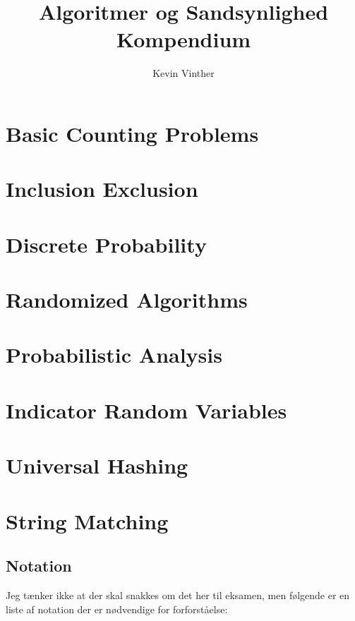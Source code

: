 \documentclass[11pt]{article}
\title{Algoritmer og Sandsynlighed \\ \large Kompendium}
\author{Kevin Vinther}
\theoremstyle{definition}
\theoremstyle{remark}
\begin{document}
\maketitle
\tableofcontents

\newpage


\section{Basic Counting Problems}
\label{sec:basiccounting}


\section{Inclusion Exclusion}
\label{sec:inclexcl}


\section{Discrete Probability}
\label{sec:discprob}


\section{Randomized Algorithms}
\label{sec:random}

\section{Probabilistic Analysis}
\label{sec:proban}

\section{Indicator Random Variables}
\label{sec:indicator}

\section{Universal Hashing}
\label{sec:hashing}

\section{String Matching}
\label{sec:string}

\subsection{Notation}
\label{subsec:stringnotation}

Jeg tænker ikke at der skal snakkes om det her til eksamen, men følgende er en liste af notation der er nødvendige for  forforståelse:
\end{document}
